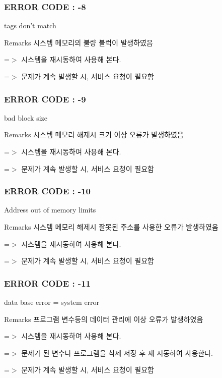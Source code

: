  \subsubsection*{E\-R\-R\-O\-R C\-O\-D\-E \-: -\/8 }

tags don't match \begin{DoxyRemark}{Remarks}
시스템 메모리의 불량 블럭이 발생하였음 \par
 =$>$ 시스템을 재시동하여 사용해 본다. \par
 =$>$ 문제가 계속 발생할 시, 서비스 요청이 필요함 \par

\end{DoxyRemark}


 \subsubsection*{E\-R\-R\-O\-R C\-O\-D\-E \-: -\/9 }

bad block size \begin{DoxyRemark}{Remarks}
시스템 메모리 해제시 크기 이상 오류가 발생하였음 \par
 =$>$ 시스템을 재시동하여 사용해 본다. \par
 =$>$ 문제가 계속 발생할 시, 서비스 요청이 필요함 \par

\end{DoxyRemark}


 \subsubsection*{E\-R\-R\-O\-R C\-O\-D\-E \-: -\/10 }

Address out of memory limits \begin{DoxyRemark}{Remarks}
시스템 메모리 해제시 잘못된 주소를 사용한 오류가 발생하였음 \par
 =$>$ 시스템을 재시동하여 사용해 본다. \par
 =$>$ 문제가 계속 발생할 시, 서비스 요청이 필요함 \par

\end{DoxyRemark}


 \subsubsection*{E\-R\-R\-O\-R C\-O\-D\-E \-: -\/11 }

data base error = system error \begin{DoxyRemark}{Remarks}
프로그램 변수등의 데이터 관리에 이상 오류가 발생하였음 \par
 =$>$ 시스템을 재시동하여 사용해 본다. \par
 =$>$ 문제가 된 변수나 프로그램을 삭제 저장 후 재 시동하여 사용한다. \par
 =$>$ 문제가 계속 발생할 시, 서비스 요청이 필요함 \par

\end{DoxyRemark}


